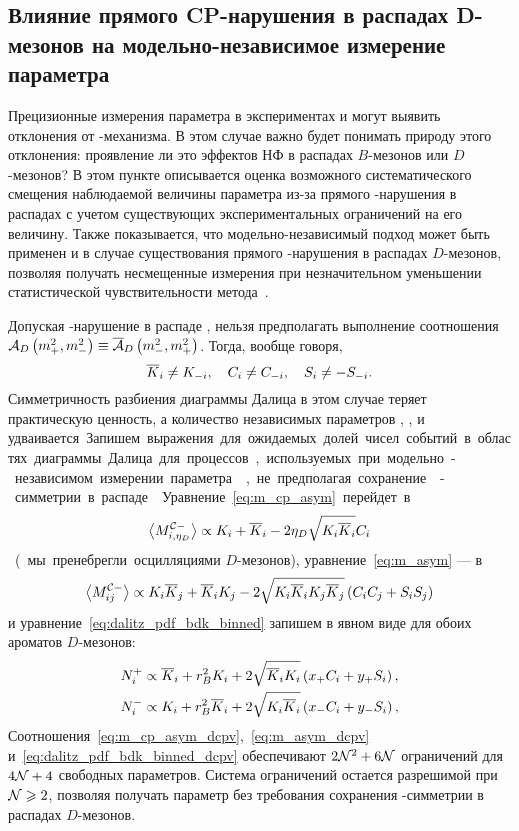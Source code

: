 \subsection{Влияние прямого CP-нарушения в распадах D-мезонов на модельно-независимое измерение параметра \gphi}\label{sec:gamma-and-dcpv-in-charm}
Прецизионные измерения параметра \gphi в экспериментах \lhcb и \belleii могут выявить отклонения от \km-механизма.  В этом случае важно будет понимать природу этого отклонения: проявление ли это эффектов НФ в распадах $B$-мезонов или $D$-мезонов?  В этом пункте описывается оценка возможного систематического смещения наблюдаемой величины параметра \gphi из-за прямого \cpconj-нарушения в распадах \dkpp с учетом существующих экспериментальных ограничений на его величину.  Также показывается, что модельно-независимый подход может быть применен и в случае существования прямого \cpconj-нарушения в распадах $D$-мезонов, позволяя получать несмещенные измерения при незначительном уменьшении статистической чувствительности метода~\cite{bdpv_cpv}.

Допуская \cpconj-нарушение в распаде \dkpp, нельзя предполагать выполнение соотношения $\mathcal{A}_D\left(m_+^2,m_-^2\right)\equiv\overline{\mathcal{A}}_D\left(m_-^2,m_+^2\right)$.  Тогда, вообще говоря,
\begin{equation}
 \overline{K}_{i}\neq K_{-i},\quad
 C_i\neq C_{-i},\quad
 S_i\neq -S_{-i}.
\end{equation}
Симметричность разбиения диаграммы Далица в этом случае теряет практическую ценность, а количество независимых параметров \ki, \kbi, \ci и \si удваивается.    

Запишем выражения для ожидаемых долей чисел событий в областях диаграммы Далица для процессов, используемых при модельно-независимом измерении параметра \gphi, не предполагая сохранение \cpconj-симметрии в распаде \dnkpp.  Уравнение~\eqref{eq:m_cp_asym} перейдет в
\begin{equation}\label{eq:m_cp_asym_dcpv}
 \left<M^{\mathcal{C}-}_{i,\eta_D}\right> \propto K_i + \overline{K}_{i} - 2\eta_D\sqrt{K_i\overline{K}_{i}}C_i
\end{equation}
(мы пренебрегли осцилляциями $D$-мезонов), уравнение~\eqref{eq:m_asym} --- в
\begin{equation}\label{eq:m_asym_dcpv}
 \left<M^{\mathcal{C}-}_{ij}\right> \propto K_i\overline{K}_{j}+ \overline{K}_{i}K_j - 2\sqrt{K_i\overline{K}_{i}K_j\overline{K}_{j}}\left(C_iC_j+S_iS_j\right)
\end{equation}
и уравнение~\eqref{eq:dalitz_pdf_bdk_binned} запишем в явном виде для обоих ароматов $D$-мезонов:
\begin{equation}\label{eq:dalitz_pdf_bdk_binned_dcpv}
\begin{split}
 N_i^{+} & \propto \overline{K}_{i}+ r_B^2K_i  + 2\sqrt{\overline{K}_{i}K_i}\left(x_{+}C_i+y_{+}S_i\right), \\
 N_i^{-} & \propto K_i + r_B^2\overline{K}_{i} + 2\sqrt{K_i\overline{K}_{i}}\left(x_{-}C_i+y_{-}S_i\right),
\end{split}
\end{equation}
Соотношения~\eqref{eq:m_cp_asym_dcpv},~\eqref{eq:m_asym_dcpv} и~\eqref{eq:dalitz_pdf_bdk_binned_dcpv} обеспечивают $2\mathcal{N}^2 + 6\mathcal{N}$ ограничений для $4\mathcal{N}+4$ свободных параметров.  Система ограничений остается разрешимой при $\mathcal{N}\geqslant 2$, позволяя получать параметр \gphi без требования сохранения \cpconj-симметрии в распадах $D$-мезонов.  

